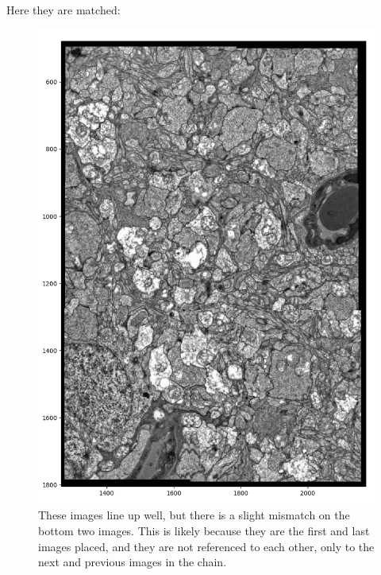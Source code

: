 \documentclass[]{article}
\begin{document}
\newpage
Here they are matched:
\begin{figure}[H]
	\centering
	\includegraphics[width=5.5in]{cell_complete_up_close.png}
	\caption{These images line up well, but there is a slight mismatch on the bottom two images. This is likely because they are the first and last images placed, and they are not referenced to each other, only to the next and previous images in the chain.}
\end{figure}
\end{document}

